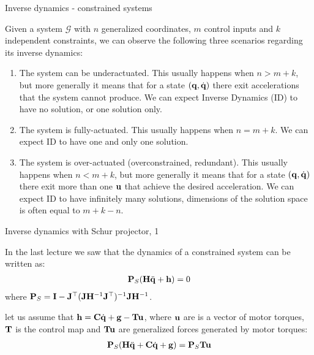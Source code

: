 \documentclass{beamer}
\begin{document}
\begin{frame}{Inverse dynamics - constrained systems}
	\begin{flushleft}
		
		Given a system $\mathcal{G}$ with $n$ generalized coordinates, $m$ control inputs and $k$ independent constraints, we can observe the following three scenarios regarding its inverse dynamics:
		
		\begin{enumerate}
			\item The system can be underactuated. This usually happens when $n > m+k$, but more generally it means that for a state $(\mathbf{q}, \dot{\mathbf{q}})$ there exit accelerations that the system cannot produce. We can expect Inverse Dynamics (ID) to have no solution, or one solution only.
			
			\item  The system is fully-actuated. This usually happens when $n = m+k$. We can expect ID to have one and only one solution.
			
			\item The system is over-actuated (overconstrained, redundant). This usually happens when $n < m+k$, but more generally it means that for a state $(\mathbf{q}, \dot{\mathbf{q}})$ there exit more than one $\mathbf{u}$ that achieve the desired acceleration.  We can expect ID to have infinitely many solutions, dimensions of the solution space is often equal to $m+k-n$.
		\end{enumerate}
		
	\end{flushleft}
\end{frame}



\begin{frame}{Inverse dynamics with Schur projector, 1}
	\begin{flushleft}
		
In the last lecture we saw that the dynamics of a constrained system can be written as: 
%
\begin{align}
	\mathbf{P}_S(\mathbf{H}\ddot{\mathbf{q}}+\mathbf{h})=0
\end{align}
%
where $\mathbf{P}_S = 
\mathbf{I}-\mathbf{J}^\top ( \mathbf{J} \mathbf{H}^{-1} \mathbf{J}^\top )^{-1} \mathbf{J} \mathbf{H}^{-1}$.

\bigskip

let us assume that $\mathbf{h} = \mathbf{C}\dot{\mathbf{q}} + \mathbf{g} - \mathbf{T}\mathbf{u}$, where $\mathbf{u}$ are is a vector of motor torques, $\mathbf{T}$ is the control map and $\mathbf{T}\mathbf{u}$ are generalized forces generated by motor torques:
%
\begin{align}
	\mathbf{P}_S(\mathbf{H}\ddot{\mathbf{q}} + \mathbf{C}\dot{\mathbf{q}}+ \mathbf{g}) = \mathbf{P}_S\mathbf{T}\mathbf{u}
\end{align}
		
		
	\end{flushleft}
\end{frame}
\end{document}
